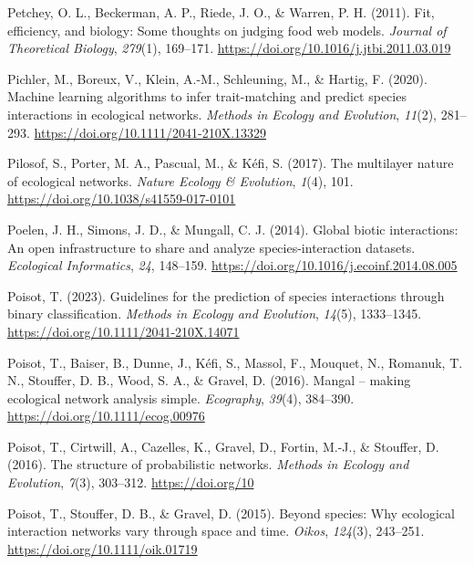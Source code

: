\documentclass[
]{article}
\newlength{\cslhangindent}
\newenvironment{CSLReferences}[2] %
 {\begin{list}{}{%
  \setlength{\itemindent}{0pt}
  \setlength{\leftmargin}{0pt}
  \setlength{\parsep}{0pt}
  \ifodd #1
   \setlength{\leftmargin}{\cslhangindent}
   \setlength{\itemindent}{-1\cslhangindent}
  \fi
  \setlength{\itemsep}{#2\baselineskip}}}
 {\end{list}}
\begin{document}
\begin{CSLReferences}{1}{0}
Petchey, O. L., Beckerman, A. P., Riede, J. O., \& Warren, P. H. (2011).
Fit, efficiency, and biology: {Some} thoughts on judging food web
models. \emph{Journal of Theoretical Biology}, \emph{279}(1), 169--171.
\url{https://doi.org/10.1016/j.jtbi.2011.03.019}

Pichler, M., Boreux, V., Klein, A.-M., Schleuning, M., \& Hartig, F.
(2020). Machine learning algorithms to infer trait-matching and predict
species interactions in ecological networks. \emph{Methods in Ecology
and Evolution}, \emph{11}(2), 281--293.
\url{https://doi.org/10.1111/2041-210X.13329}

Pilosof, S., Porter, M. A., Pascual, M., \& Kéfi, S. (2017). The
multilayer nature of ecological networks. \emph{Nature Ecology \&
Evolution}, \emph{1}(4), 101.
\url{https://doi.org/10.1038/s41559-017-0101}

Poelen, J. H., Simons, J. D., \& Mungall, C. J. (2014). Global biotic
interactions: {An} open infrastructure to share and analyze
species-interaction datasets. \emph{Ecological Informatics}, \emph{24},
148--159. \url{https://doi.org/10.1016/j.ecoinf.2014.08.005}

Poisot, T. (2023). Guidelines for the prediction of species interactions
through binary classification. \emph{Methods in Ecology and Evolution},
\emph{14}(5), 1333--1345. \url{https://doi.org/10.1111/2041-210X.14071}

Poisot, T., Baiser, B., Dunne, J., Kéfi, S., Massol, F., Mouquet, N.,
Romanuk, T. N., Stouffer, D. B., Wood, S. A., \& Gravel, D. (2016).
Mangal -- making ecological network analysis simple. \emph{Ecography},
\emph{39}(4), 384--390. \url{https://doi.org/10.1111/ecog.00976}

Poisot, T., Cirtwill, A., Cazelles, K., Gravel, D., Fortin, M.-J., \&
Stouffer, D. (2016). The structure of probabilistic networks.
\emph{Methods in Ecology and Evolution}, \emph{7}(3), 303--312.
\url{https://doi.org/10}

Poisot, T., Stouffer, D. B., \& Gravel, D. (2015). Beyond species: Why
ecological interaction networks vary through space and time.
\emph{Oikos}, \emph{124}(3), 243--251.
\url{https://doi.org/10.1111/oik.01719}


\end{CSLReferences}
\end{document}

